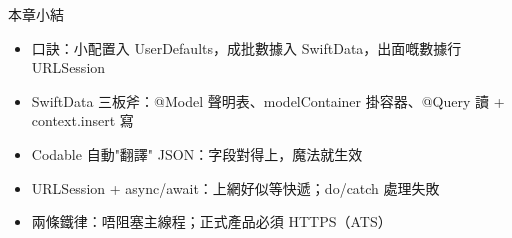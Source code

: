 \begin{tcbsummary}{本章小結}
\begin{itemize}
  \item 口訣：小配置入 UserDefaults，成批數據入 SwiftData，出面嘅數據行 URLSession
  \item SwiftData 三板斧：@Model 聲明表、modelContainer 掛容器、@Query 讀 + context.insert 寫
  \item Codable 自動"翻譯" JSON：字段對得上，魔法就生效
  \item URLSession + async/await：上網好似等快遞；do/catch 處理失敗
  \item 兩條鐵律：唔阻塞主線程；正式產品必須 HTTPS（ATS）
\end{itemize}

\end{tcbsummary}
